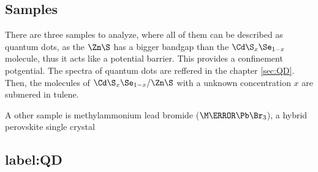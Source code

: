 \subsection{Samples}
\label{sec:samples}

There are three samples to analyze, where all of them can be described as quantum dots, as the $\ce{\Zn\S}$ has a bigger bandgap than the $\ce{\Cd\S_x\Se_{1-x}}$ molecule, thus it acts like a potential barrier.
This provides a confinement potgential. The spectra of quantum dots are reffered in the chapter \ref{sec:QD}.
Then, the molecules of $\ce{\Cd\S_x\Se_{1-x}/\Zn\S}$ with a unknown concentration $x$ are submered in tulene.

A other sample is methylammonium lead bromide ($\ce{\M\A\Pb\Br_3}$), a hybrid perovskite single crystal 
\subsection{label:QD}

